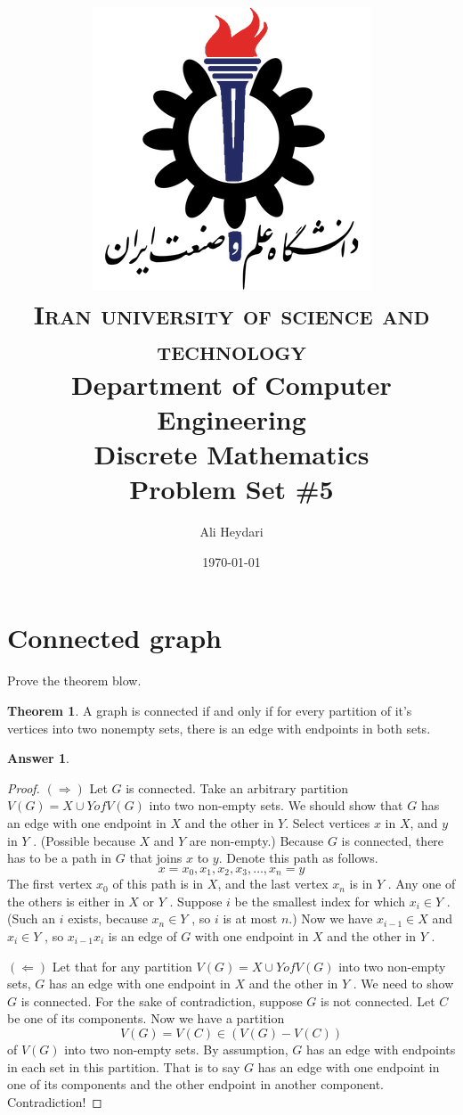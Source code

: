 \documentclass[a4paper]{article}
\title{
\textsc{
\center
\includegraphics[scale=0.5]{IUST_logo_color} \\
Iran university of science and technology} \\ [5pt] %
Department of Computer Engineering \\[8pt]
Discrete Mathematics\\Problem Set \#5 \\
}
\author{Ali Heydari}
\date{\today}
\renewcommand{\(}{\left(}
\renewcommand{\)}{\right)}
\theoremstyle{plain}
\theoremstyle{plain}
\theoremstyle{definition}
\newtheorem*{answer}{Answer}
\newtheorem{theorem}{Theorem}[section]
\begin{document}
\maketitle

\section{Connected graph}
Prove the theorem blow.
\begin{theorem}
A graph is connected if and only if for every partition of it's vertices into two nonempty sets, there
is an edge with endpoints in both sets.
\end{theorem}
\begin{shaded}
\begin{answer}
\begin{proof}
$(\Rightarrow)$ Let $G$ is connected. Take an arbitrary partition $V (G) = X \cup Y of V (G)$ into two non-empty sets. We should show that $G$ has an edge with one endpoint in $X$ and the other in $Y$. Select vertices $x$ in $X$, and $y$ in $Y$ . (Possible because $X$ and $Y$ are non-empty.) Because $G$ is connected, there has to be a path in $G$ that joins $x$ to $y$. Denote this path as follows.
$$x = x_0, x_1, x_2, x_3, \dots , x_n = y$$
The first vertex $x_0$ of this path is in $X$, and the last vertex $x_n$ is in $Y$ . Any one of the others is either in $X$ or $Y$ . Suppose $i$ be the smallest index for which $x_i \in Y$ . (Such an $i$ exists, because $x_n \in Y$ , so $i$ is at most $n$.) Now we have $x_{i-1} \in X$ and $x_i \in Y$ , so $x_{i-1}x_i$
is an edge of $G$ with one endpoint in $X$ and the other in $Y$ .

$(\Leftarrow)$ Let that for any partition $V (G) = X \cup Y of V (G)$ into two non-empty sets, $G$ has an edge with one endpoint in $X$ and the other in $Y$ . We need to show $G$ is connected. For the sake of contradiction, suppose $G$ is not connected. Let $C$ be one of its components. Now we have a partition
$$V (G) = V (C) \in (V (G) − V (C))$$
 of $V (G)$ into two non-empty sets. By assumption, $G$ has an edge with endpoints in each set in this partition. That is to say $G$ has an edge with one endpoint in one of its components and the other endpoint in another component. Contradiction!
 \end{proof}
\end{answer}
\end{shaded}
\end{document}
